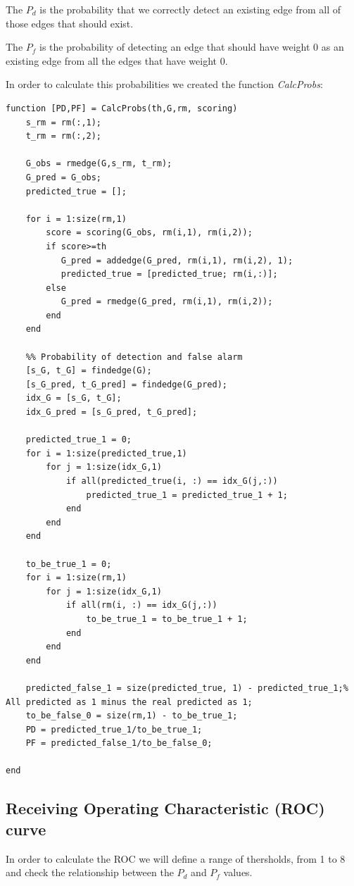 \documentclass[12pt]{article}
\begin{document}
\justifying
The $P_d$ is the probability that we correctly detect an existing edge from all of those edges that should exist.

\justifying
The $P_f$ is the probability of detecting an edge that should have weight 0 as an existing edge from all the edges that have weight 0. 

In order to calculate this probabilities we created the function \textit{CalcProbs}:

\begin{lstlisting}
function [PD,PF] = CalcProbs(th,G,rm, scoring)
    s_rm = rm(:,1);
    t_rm = rm(:,2);

    G_obs = rmedge(G,s_rm, t_rm);
    G_pred = G_obs;
    predicted_true = [];
    
    for i = 1:size(rm,1)
        score = scoring(G_obs, rm(i,1), rm(i,2));
        if score>=th
           G_pred = addedge(G_pred, rm(i,1), rm(i,2), 1);
           predicted_true = [predicted_true; rm(i,:)];
        else
           G_pred = rmedge(G_pred, rm(i,1), rm(i,2));
        end    
    end
    
    %% Probability of detection and false alarm
    [s_G, t_G] = findedge(G);
    [s_G_pred, t_G_pred] = findedge(G_pred);
    idx_G = [s_G, t_G];
    idx_G_pred = [s_G_pred, t_G_pred];
    
    predicted_true_1 = 0;
    for i = 1:size(predicted_true,1)
        for j = 1:size(idx_G,1)
            if all(predicted_true(i, :) == idx_G(j,:))
                predicted_true_1 = predicted_true_1 + 1;
            end
        end
    end
    
    to_be_true_1 = 0;
    for i = 1:size(rm,1)
        for j = 1:size(idx_G,1)
            if all(rm(i, :) == idx_G(j,:))
                to_be_true_1 = to_be_true_1 + 1;
            end
        end
    end
    
    predicted_false_1 = size(predicted_true, 1) - predicted_true_1;% All predicted as 1 minus the real predicted as 1;
    to_be_false_0 = size(rm,1) - to_be_true_1;
    PD = predicted_true_1/to_be_true_1;
    PF = predicted_false_1/to_be_false_0;

end
\end{lstlisting}

\subsection{Receiving Operating Characteristic (ROC) curve}
\justifying
In order to calculate the ROC we will define a range of thersholds, from 1 to 8 and check the relationship between the $P_d$ and $P_f$ values.
\end{document}
